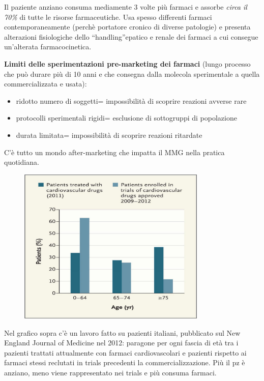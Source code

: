  Il paziente anziano consuma mediamente 3 volte più farmaci e assorbe
  \emph{circa il 70\%} di tutte le risorse farmaceutiche. Usa spesso
  differenti farmaci contemporaneamente (perchè portatore cronico di
  diverse patologie) e presenta alterazioni fisiologiche dello
  ``handling''epatico e renale dei farmaci a cui consegue un'alterata
  farmacocinetica.

  \textbf{Limiti delle sperimentazioni pre-marketing dei farmaci} (lungo
  processo che può durare più di 10 anni e che consegna dalla molecola
  sperimentale a quella commercializzata e usata):

\begin{itemize}
\item
  ridotto numero di soggetti= impossibilità di scoprire reazioni avverse
  rare
\item
  protocolli sperimentali rigidi= esclusione di sottogruppi di
  popolazione
\item
  durata limitata= impossibilità di scoprire reazioni ritardate
\end{itemize}

  C'è tutto un mondo after-marketing che impatta il MMG nella pratica
  quotidiana.

\begin{figure}[!ht]
\centering
	\includegraphics[width=0.8\textwidth]{37/image1.jpg}
	\end{figure}

  Nel grafico sopra c'è un lavoro fatto su pazienti italiani, pubblicato
  sul New England Journal of Medicine nel 2012: paragone per ogni fascia
  di età tra i pazienti trattati attualmente con farmaci cardiovascolari
  e pazienti rispetto ai farmaci stessi reclutati in trials precedenti
  la commercializzazione. Più il pz è anziano, meno viene rappresentato
  nei trials e più consuma farmaci.


